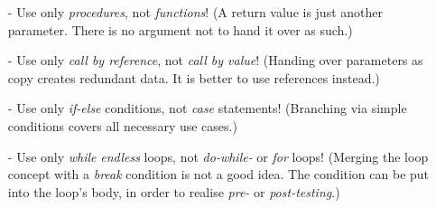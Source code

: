 \begin{itemize}
    \item[-] Use only \emph{procedures}, not \emph{functions}! (A return value is
        just another parameter. There is no argument not to hand it over as such.)
    \item[-] Use only \emph{call by reference}, not \emph{call by value}!
        (Handing over parameters as copy creates redundant data. It is better
        to use references instead.)
    \item[-] Use only \emph{if-else} conditions, not \emph{case} statements!
        (Branching via simple conditions covers all necessary use cases.)
    \item[-] Use only \emph{while} \emph{endless} loops, not \emph{do-while-}
        or \emph{for} loops! (Merging the loop concept with a \emph{break}
        condition is not a good idea. The condition can be put into the loop's
        body, in order to realise \emph{pre-} or \emph{post-testing}.)
\end{itemize}
